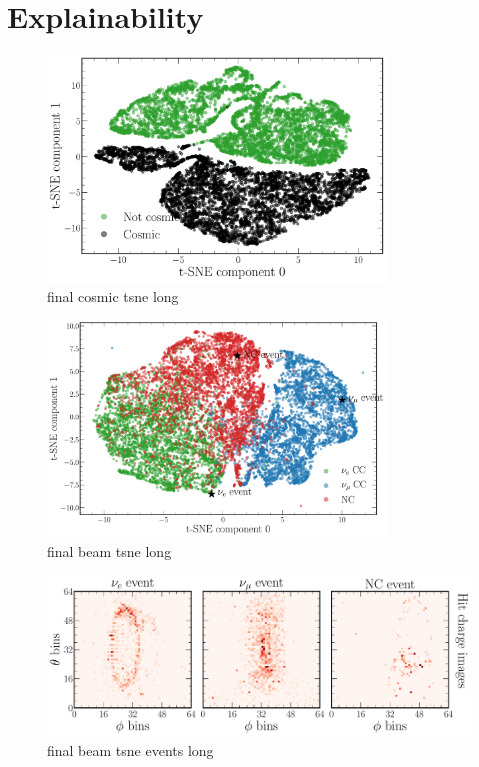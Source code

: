 \section{Explainability} %
\label{sec:cvn_explain} %

\begin{figure} %
    \includegraphics[width=0.8\textwidth]{diagrams/6-cvn/chipsnet/final_cosmic_tsne.pdf}
    \caption[final cosmic tsne short]
    {final cosmic tsne long}
    \label{fig:final_cosmic_tsne}
\end{figure}

\begin{figure} %
    \includegraphics[width=0.8\textwidth]{diagrams/6-cvn/chipsnet/final_beam_tsne.pdf}
    \caption[final beam tsne short]
    {final beam tsne long}
    \label{fig:final_beam_tsne}
\end{figure}

\begin{figure} %
    \includegraphics[width=\textwidth]{diagrams/6-cvn/chipsnet/final_beam_tsne_events.pdf}
    \caption[final beam tsne events short]
    {final beam tsne events long}
    \label{fig:final_beam_tsne_events}
\end{figure}

